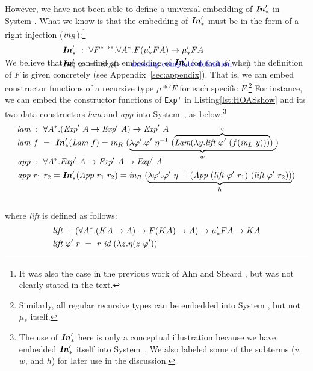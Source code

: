 However, we have not been able to define a universal embedding of $\textbf{\textit{In}}_{*}'$
in System \Fw. What we know is that the embedding of $\textbf{\textit{In}}_{*}'$ must be
in the form of a right injection ($\textit{in}_{R}$):\vspace*{-1ex}\footnote{%
	It was also the case in the previous work of Ahn and Sheard
	\cite{AhnShe11}, but was not clearly stated in the text.}
\begin{align*}
&\textbf{\textit{In}}_{*}' ~:~ \forall F^{*\to*}.\forall A^{*}.F(\mu_{*}' F A) \to \mu_{*}' F A \\
&\textbf{\textit{In}}_{*}'~x ~=~ \textit{in}_{R}(\,\cdots\;\text{\color{blue}missing complete definition}\;\cdots)
	\\[-5ex]
\end{align*}
We believe that we can find an embedding of $\textbf{\textit{In}}_{*}'$ for each $F$ when
the definition of $F$ is given concretely (see Appendix~\ref{sec:appendix}).
That is, we can embed constructor functions of a recursive type $\mu{*}' F$
for each specific $F$.\footnote{
	Similarly, all regular recursive types can be embedded into System \F,
	but not $\mu_{*}$ itself.}
For instance, we can embed the constructor functions of \lstinline{Exp'}
in Listing\;\ref{lst:HOASshow} and its two data constructors \textit{lam}
and \textit{app} into System~\Fw, as below:\vspace*{-1ex}\footnote{
	The use of $\textbf{\textit{In}}_{*}'$ here is only a conceptual illustration
	because we have embedded $\textbf{\textit{In}}_{*}'$ itself into System~\Fw.
	We also labeled some of the subterms ($v$, $w$, and $h$)
	for later use in the discussion.}%
\label{align:embed}%
\begin{align*}
\textit{lam}&~:~\forall A^{*}.
		(\textit{Exp}'~A \to \textit{Exp}'~A) \to \textit{Exp}'~A
\\[-3ex]
\textit{lam}&~f~=~\textbf{\textit{In}}_{*}'(\textit{Lam}~f)
= \textit{in}_{R}~(\underbrace{
	\lambda \varphi'.\varphi'~\eta^{-1}~
	(\overbrace{\textit{Lam}(\lambda y.\textit{lift}~\varphi'~(f(\textit{in}_{L}~y))) }^v)\;
	}_w)
\\[-1.5ex]
\textit{app}&~:~\forall A^{*}.
		\textit{Exp}'~A \to \textit{Exp}'~A \to \textit{Exp}'~A \\
\textit{app}&~r_1~r_2 = \textbf{\textit{In}}_{*}'(\textit{App}~r_1~r_2)
= \textit{in}_{R}~(\underbrace{
		\lambda \varphi'.\varphi'~\eta^{-1}~
		(\textit{App}~(\textit{lift}~\varphi'~r_1)~(\textit{lift}~\varphi'~r_2))}_h)
\end{align*}~\vspace*{-4.5ex}\\
where \textit{lift} is defined as follows:\vspace*{-1ex}
\begin{align*}
& \textit{lift}~:~(\forall A^{*}.(K A\to A)\to F(K A)\to A)\to \mu_{*}' F A\to K A\\
& \textit{lift}~\varphi'~r ~=~ r~\textit{id}~(\lambda z.\eta(z~\varphi'))
\end{align*}

